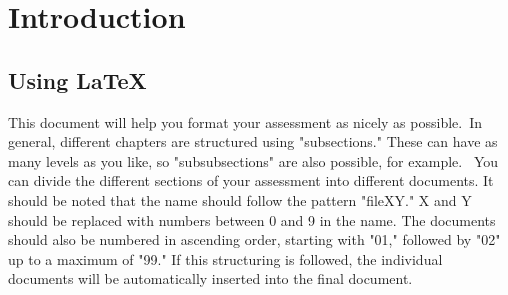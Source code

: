 \section{Introduction}

\subsection{Using LaTeX}
This document will help you format your assessment as nicely as possible.\
In general, different chapters are structured using "subsections." These can have as many levels as you like, so "subsubsections" are also possible, for example. \
You can divide the different sections of your assessment into different documents. It should be noted that the name should follow the pattern "fileXY." X and Y should be replaced with numbers between 0 and 9 in the name. The documents should also be numbered in ascending order, starting with "01," followed by "02" up to a maximum of "99." If this structuring is followed, the individual documents will be automatically inserted into the final document.